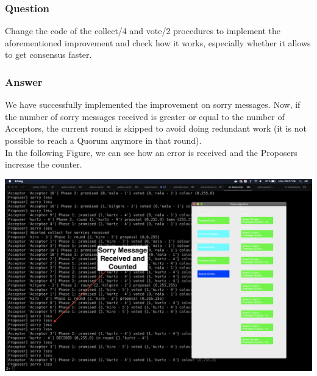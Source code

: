 \documentclass[a4paper, 10pt]{article}
\begin{document}
\subsubsection{Question}
Change the code of the collect/4 and vote/2 procedures to implement the aforementioned improvement and check how it works, especially whether it allows to get consensus faster.

\subsubsection{Answer}
We have successfully implemented the improvement on sorry messages. Now, if the number of sorry messages received is greater or equal to the number of Acceptors, the current round is skipped to avoid doing redundant work (it is not possible to reach a Quorum anymore in that round).\\

In the following Figure, we can see how an error is received and the Proposers increase the counter.\\
\begin{minipage}[t]{\linewidth}
  \centering
  \includegraphics[width=\textwidth]{sorry_counted.png}
\end{minipage}\\\\
\end{document}
